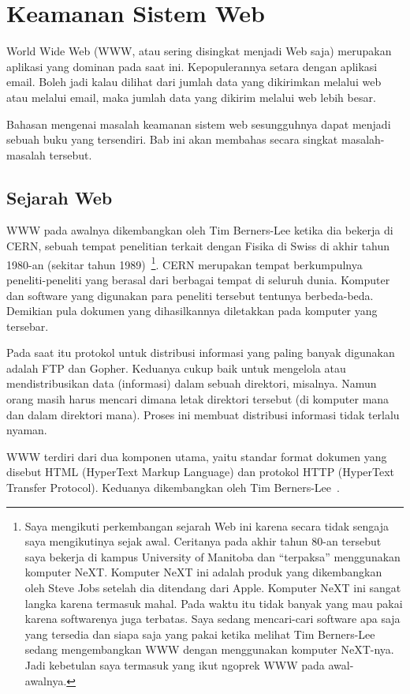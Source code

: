\chapter{Keamanan Sistem Web}
World Wide Web (WWW, atau sering disingkat menjadi Web saja) merupakan aplikasi
yang dominan pada saat ini. Kepopulerannya setara dengan aplikasi email. Boleh
jadi kalau dilihat dari jumlah data yang dikirimkan melalui web atau melalui
email, maka jumlah data yang dikirim melalui web lebih besar.

Bahasan mengenai masalah keamanan sistem web sesungguhnya dapat menjadi sebuah
buku yang tersendiri. Bab ini akan membahas secara singkat masalah-masalah
tersebut.

\section{Sejarah Web}
WWW pada awalnya dikembangkan oleh Tim Berners-Lee ketika dia bekerja di CERN,
sebuah tempat penelitian terkait dengan Fisika di Swiss di akhir tahun 1980-an
(sekitar tahun 1989)~\footnote{Saya mengikuti perkembangan sejarah Web ini
karena secara tidak sengaja saya mengikutinya sejak awal. Ceritanya pada akhir
tahun 80-an tersebut saya bekerja di kampus University of Manitoba dan
``terpaksa'' menggunakan komputer NeXT. Komputer NeXT ini adalah produk yang
dikembangkan oleh Steve Jobs setelah dia ditendang dari Apple. Komputer NeXT
ini sangat langka karena termasuk mahal. Pada waktu itu tidak banyak yang mau
pakai karena softwarenya juga terbatas. Saya sedang mencari-cari software apa
saja yang tersedia dan siapa saja yang pakai ketika melihat Tim Berners-Lee
sedang mengembangkan WWW dengan menggunakan komputer NeXT-nya. Jadi kebetulan
saya termasuk yang ikut ngoprek WWW pada awal-awalnya.}.
CERN merupakan tempat berkumpulnya peneliti-peneliti yang berasal dari berbagai
tempat di seluruh dunia. Komputer dan software yang digunakan para peneliti
tersebut tentunya berbeda-beda. Demikian pula dokumen yang dihasilkannya
diletakkan pada komputer yang tersebar.

Pada saat itu protokol untuk distribusi informasi yang paling banyak digunakan
adalah FTP dan Gopher. Keduanya cukup baik untuk mengelola atau
mendistribusikan data (informasi) dalam sebuah direktori, misalnya. Namun orang
masih harus mencari dimana letak direktori tersebut (di komputer mana dan dalam
direktori mana). Proses ini membuat distribusi informasi tidak terlalu nyaman.

WWW terdiri dari dua komponen utama, yaitu standar format dokumen yang
disebut HTML (HyperText Markup Language) dan protokol HTTP (HyperText Transfer
Protocol). Keduanya dikembangkan oleh Tim Berners-Lee~\cite{webbook}.

